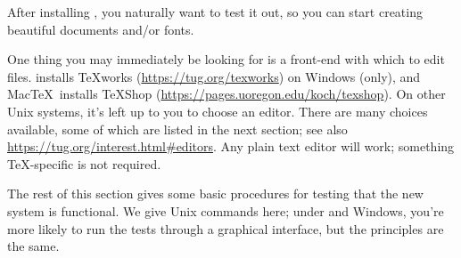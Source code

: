 \documentclass{article}
\begin{document}
After installing \TL{}, you naturally want to test it out, so you can
start creating beautiful documents and\slash or fonts.

One thing you may immediately be looking for is a front-end with which
to edit files.  \TL{} installs \TeX{}works
(\url{https://tug.org/texworks}) on Windows (only), and Mac\TeX\ installs
TeXShop (\url{https://pages.uoregon.edu/koch/texshop}).  On other Unix
systems, it's left up to you to choose an editor.  There are many
choices available, some of which are listed in the next section; see
also \url{https://tug.org/interest.html#editors}.  Any plain text editor
will work; something \TeX-specific is not required.

The rest of this section gives some basic procedures for testing that
the new system is functional.  We give Unix commands here; under
\MacOSX{} and Windows, you're more likely to run the tests through a
graphical interface, but the principles are the same.
\end{document}
